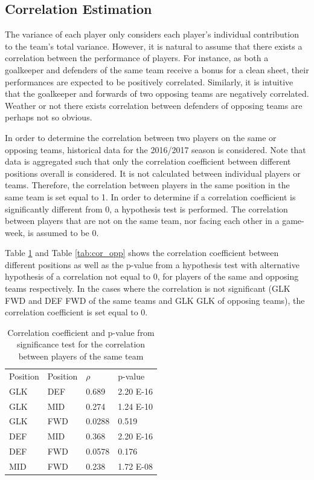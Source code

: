 \subsection{Correlation Estimation}
The variance of each player only considers each player's individual contribution to the team's total variance. However, it is natural to assume that there exists a correlation between the performance of players. For instance, as both a goalkeeper and defenders of the same team receive a bonus for a clean sheet, their performances are expected to be positively correlated. Similarly, it is intuitive that the goalkeeper and forwards of two opposing teams are negatively correlated. Weather or not there exists correlation between defenders of opposing teams are perhaps not so obvious. \newpar

In order to determine the correlation between two players on the same or opposing teams, historical data for the 2016/2017 season is considered. Note that data is aggregated such that only the correlation coefficient between different positions overall is considered. It is not calculated between individual players or teams. Therefore, the correlation between players in the same position in the same team is set equal to 1. In order to determine if a correlation coefficient is significantly different from 0, a hypothesis test is performed. The correlation between players that are not on the same team, nor facing each other in a game-week, is assumed to be 0.\newpar

Table \ref{tab:cor_team} and Table \ref{tab:cor_opp} shows the correlation coefficient between different positions as well as the p-value from a hypothesis test with alternative hypothesis of a correlation not equal to 0, for players of the same and opposing teams respectively. In the cases where the correlation is not significant (GLK FWD and DEF FWD of the same teams and GLK GLK of opposing teams), the correlation coefficient is set equal to 0.

\begin{table}[H]
\centering
\caption{Correlation coefficient and p-value from significance test for the correlation between players of the same team}
\label{tab:cor_team}
\begin{tabular}{llll}
Position & Position & $\rho$    & p-value  \\
GLK      & DEF      & 0.689  & 2.20 E-16 \\
GLK      & MID      & 0.274  & 1.24 E-10 \\
GLK      & FWD      & 0.0288 & 0.519    \\
DEF      & MID      & 0.368  & 2.20 E-16 \\
DEF      & FWD      & 0.0578 & 0.176    \\
MID      & FWD      & 0.238  & 1.72 E-08
\end{tabular}
\end{table}

